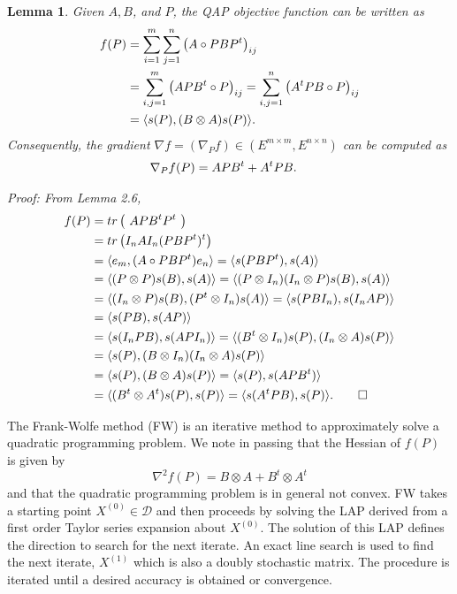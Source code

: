 \documentclass{amsart}
\theoremstyle{plain} \newtheorem{Exa}{Example}[section]
\newtheorem{Lem}{Lemma}[section]
\begin{document}
\begin{Lem}
Given $A,B$, and $P$, the QAP objective function can be written as
$$ \aligned
f(P)
&= \sum_{i=1}^m \sum_{j=1}^n \left( A \circ PBP^t \right)_{ij}
\label{eq:r23$i$} \\
&= \sum_{i,j=1}^m \left( APB^t \circ P \right)_{ij}
= \sum_{i,j=1}^n \left( A^tPB \circ P \right)_{ij}
\label{eq:r23$ii$} \\
&= \langle s(P), (B \otimes A) s(P) \rangle .
\label{eq:r23$iii$}
\endaligned
$$
Consequently, the gradient
$\nabla f = ( \nabla_Pf  ) \in ( E^{m \times m}, E^{n \times n})$
can be computed as
$$
\aligned
\nabla_Pf(P) &= APB^t+ A^tPB.
\endaligned
\label{eq:r24}
$$

Proof: From Lemma 2.6, $$ \aligned f(P) &= tr\left({ \ APB^t P^t
\ }\right)  \\ &= tr\left({ I_n A I_n (PBP^t)^t
}\right)  \\ &= \langle e_m, (A \circ PBP^t) e_n \rangle = \langle
s(PBP^t), s(A) \rangle \\ &= \langle (P \otimes P)s(B), s(A)
\rangle = \langle (P \otimes I_n) (I_n \otimes P) s(B), s(A)
\rangle \\ &= \langle (I_n \otimes P) s(B), (P^t \otimes I_n) s(A)
\rangle = \langle s(PBI_n), s(I_nAP) \rangle \\ &= \langle s(PB),
s(AP) \rangle \\ &= \langle s(I_nPB), s(API_n) \rangle = \langle
(B^t \otimes I_n) s(P), (I_n \otimes A) s(P) \rangle \\ &= \langle
s(P), (B \otimes I_n) (I_n \otimes A) s(P) \rangle \\ &= \langle
s(P), (B \otimes A) s(P) \rangle = \langle s(P), s(APB^t) \rangle
\\ &= \langle (B^t \otimes A^t) s(P), s(P) \rangle = \langle s(A^t
PB), s(P) \rangle . \qed
\endaligned
$$
\end{Lem}

The Frank-Wolfe method (FW) is an iterative method to approximately solve
a quadratic programming problem.   We note in passing that the Hessian of $f(P)$ is given by $$\nabla^{2}f(P)=B \otimes A+B^{t} \otimes A^{t}$$ 
and that the quadratic programming problem is in general not convex.
FW takes a starting point 
$X^{(0)}\in \mathcal D$ and then proceeds by solving the LAP derived from a first order Taylor series expansion about $X^{(0)}.$   The solution of this LAP defines the
direction to search for the next iterate.  An exact line search is used to find the next iterate,
$X^{(1)}$  which is also a doubly stochastic matrix.  The procedure is iterated until a desired 
accuracy is obtained or convergence.    
\end{document}
